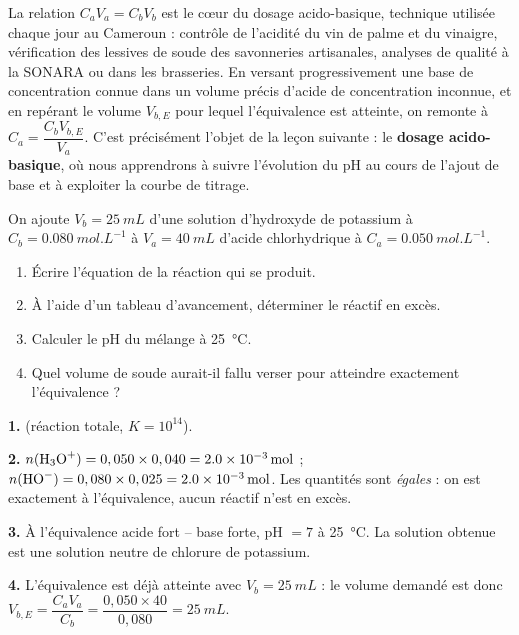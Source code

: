 \documentclass[11pt]{article}
\newcommand{\cle}[1]{{\popxbold\color{popdark}#1}}
\begin{document}
\begin{savaistu}
La relation $C_a V_a = C_b V_b$ est le cœur du \cle{dosage acido-basique}, technique utilisée chaque jour au Cameroun : contrôle de l'acidité du vin de palme et du vinaigre, vérification des lessives de soude des savonneries artisanales, analyses de qualité à la SONARA ou dans les brasseries. En versant progressivement une base de concentration connue dans un volume précis d'acide de concentration inconnue, et en repérant le volume $V_{b,E}$ pour lequel l'équivalence est atteinte, on remonte à $C_a = \dfrac{C_b V_{b,E}}{V_a}$. C'est précisément l'objet de la leçon suivante : le \textbf{dosage acido-basique}, où nous apprendrons à suivre l'évolution du pH au cours de l'ajout de base et à exploiter la courbe de titrage.
\end{savaistu}

\begin{exercice}
On ajoute $V_b = \SI{25}{mL}$ d'une solution d'hydroxyde de potassium à $C_b = \SI{0,080}{mol.L^{-1}}$ à $V_a = \SI{40}{mL}$ d'acide chlorhydrique à $C_a = \SI{0,050}{mol.L^{-1}}$.
\begin{enumerate}
\item Écrire l'équation de la réaction qui se produit.
\item À l'aide d'un tableau d'avancement, déterminer le réactif en excès.
\item Calculer le pH du mélange à \SI{25}{\celsius}.
\item Quel volume de soude aurait-il fallu verser pour atteindre exactement l'équivalence ?
\end{enumerate}
\end{exercice}

\begin{corrige}[Exercice 1]
\textbf{1.}  (réaction totale, $K = 10^{14}$).

\textbf{2.} $n(\ce{H3O+}) = 0,050 \times 0,040 = \SI{2,0e-3}{mol}$ ; $n(\ce{HO-}) = 0,080 \times 0,025 = \SI{2,0e-3}{mol}$. Les quantités sont \emph{égales} : on est exactement à l'équivalence, aucun réactif n'est en excès.

\textbf{3.} À l'équivalence acide fort -- base forte, pH $= 7$ à \SI{25}{\celsius}. La solution obtenue est une solution neutre de chlorure de potassium.

\textbf{4.} L'équivalence est déjà atteinte avec $V_b = \SI{25}{mL}$ : le volume demandé est donc $V_{b,E} = \dfrac{C_a V_a}{C_b} = \dfrac{0,050 \times 40}{0,080} = \SI{25}{mL}$.
\end{corrige}
\end{document}
